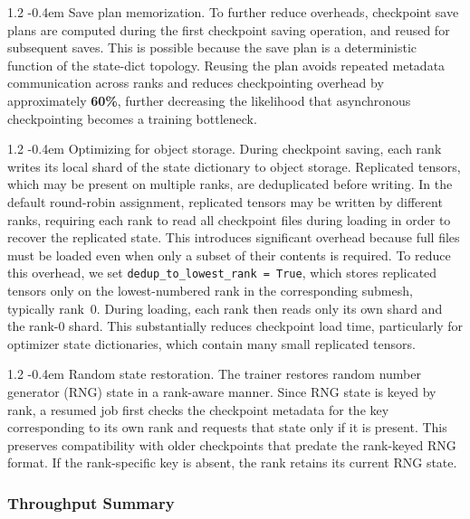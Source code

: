 \documentclass{llmxive}
\makeatletter
\providecommand{\paragraph}{  \@startsection{paragraph}{4}{\z@}    {1\baselineskip \@plus .2\baselineskip}    {-0.4em}    {\normalfont\normalsize\bfseries}}
\makeatother
\begin{document}
\paragraph{Save plan memorization.} To further reduce overheads, checkpoint save plans are computed during the first checkpoint saving operation, and reused for subsequent saves. This is possible because the save plan is a deterministic function of the state-dict topology. Reusing the plan avoids repeated metadata communication across ranks and reduces checkpointing overhead by approximately \textbf{60\%}, further decreasing the likelihood that asynchronous checkpointing becomes a training bottleneck.

\paragraph{Optimizing for object storage.} During checkpoint saving, each rank writes its local shard of the state dictionary to object storage. Replicated tensors, which may be present on multiple ranks, are deduplicated before writing. In the default round-robin assignment, replicated tensors may be written by different ranks, requiring each rank to read all checkpoint files during loading in order to recover the replicated state. This introduces significant overhead because full files must be loaded even when only a subset of their contents is required. To reduce this overhead, we set \texttt{dedup\_to\_lowest\_rank = True}, which stores replicated tensors only on the lowest-numbered rank in the corresponding submesh, typically rank~0. During loading, each rank then reads only its own shard and the rank-0 shard. This substantially reduces checkpoint load time, particularly for optimizer state dictionaries, which contain many small replicated tensors.

\paragraph{Random state restoration.} The trainer restores random number generator (RNG) state in a rank-aware manner. Since RNG state is keyed by rank, a resumed job first checks the checkpoint metadata for the key corresponding to its own rank and requests that state only if it is present. This preserves compatibility with older checkpoints that predate the rank-keyed RNG format. If the rank-specific key is absent, the rank retains its current RNG state.

\subsubsection{Throughput Summary}
\label{sec:training_throughput_summary}
\end{document}
